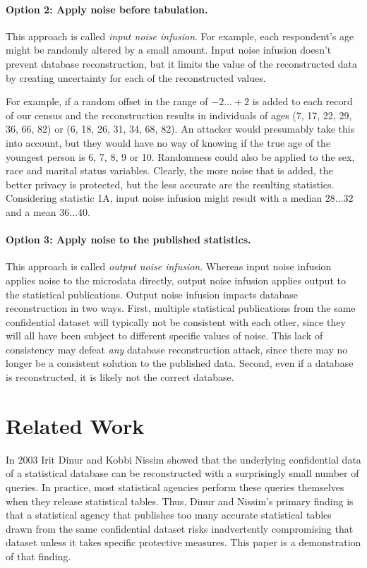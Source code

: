 \documentclass[runningheads]{llncs}
\begin{document}
\paragraph{Option 2: Apply noise before tabulation.} This approach is called \emph{input noise infusion}. For example, each respondent's age might be randomly
altered by a small amount. Input noise infusion
doesn't prevent database reconstruction, but it limits the value of
the reconstructed data by creating uncertainty for each of the
reconstructed values. 

For example, if a random offset in the range of $-2 \ldots +2$ is
added to each record of our census and the reconstruction results in individuals of
ages (7, 17, 22, 29, 36, 66, 82) or (6, 18, 26, 31, 34, 68,
82). An attacker would presumably take this into account, but they
would have no way of knowing if the true age of the youngest person is
6, 7, 8, 9 or 10. Randomness could also be applied to the sex, race
and marital status variables. Clearly, the more noise that is added,
the better privacy is protected, but the less accurate are the
resulting statistics. Considering statistic 1A, input noise infusion
might result with a median $28\ldots32$ and a mean $36\ldots40$. 

\paragraph{Option 3: Apply noise to the published statistics.} This
approach is called \emph{output noise infusion}. Whereas input noise infusion
applies noise to the microdata directly, output noise infusion applies
output to the statistical publications.  Output noise infusion impacts
database reconstruction in two ways. First, multiple statistical
publications from the same confidential dataset will typically not be consistent with each other, since they will all have been subject to different specific values of noise. This lack of consistency may defeat \emph{any} database reconstruction attack, since there may no longer be a consistent solution to the published data. Second, even if a
database is reconstructed, it is likely not the correct database.


\section{Related Work}

In 2003 Irit Dinur and Kobbi Nissim\cite{DinurNissim2003} showed that the underlying
confidential data of a statistical database can be reconstructed with
a surprisingly small number of queries. In practice, most statistical
agencies perform these queries themselves when they release
statistical tables. Thus, Dinur and Nissim's primary finding
is that a statistical agency that publishes too many accurate statistical
tables drawn from the same confidential dataset risks inadvertently
compromising that dataset unless it takes specific protective
measures. This paper is a demonstration of that finding.
\end{document}

